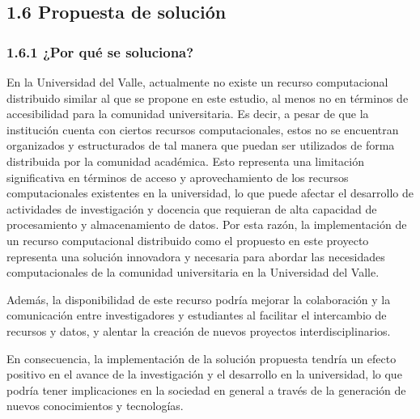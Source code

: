 \begin{doublespace}
\begin{multicols}{2}
  \subsection{1.6 Propuesta de solución}
  \subsubsection{1.6.1 ¿Por qué se soluciona?}

  En la Universidad del Valle, actualmente no existe un recurso computacional distribuido similar al que se propone en este estudio, al menos no en términos de accesibilidad para la comunidad universitaria. Es decir, a pesar de que la institución cuenta con ciertos recursos computacionales, estos no se encuentran organizados y estructurados de tal manera que puedan ser utilizados de forma distribuida por la comunidad académica. Esto representa una limitación significativa en términos de acceso y aprovechamiento de los recursos computacionales existentes en la universidad, lo que puede afectar el desarrollo de actividades de investigación y docencia que requieran de alta capacidad de procesamiento y almacenamiento de datos. Por esta razón, la implementación de un recurso computacional distribuido como el propuesto en este proyecto representa una solución innovadora y necesaria para abordar las necesidades computacionales de la comunidad universitaria en la Universidad del Valle.

  Además, la disponibilidad de este recurso podría mejorar la colaboración y la comunicación entre investigadores y estudiantes al facilitar el intercambio de recursos y datos, y alentar la creación de nuevos proyectos interdisciplinarios. 
  
  En consecuencia, la implementación de la solución propuesta tendría un efecto positivo en el avance de la investigación y el desarrollo en la universidad, lo que podría tener implicaciones en la sociedad en general a través de la generación de nuevos conocimientos y tecnologías.


\end{multicols}
\end{doublespace}
